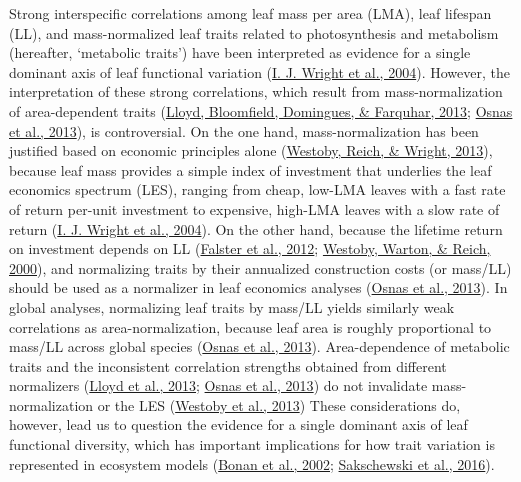 \documentclass[
  12pt,
  letterpaper,
  DIV=11,
  numbers=noendperiod]{scrartcl}
\begin{document}
Strong interspecific correlations among leaf mass per area (LMA), leaf
lifespan (LL), and mass-normalized leaf traits related to photosynthesis
and metabolism (hereafter, `metabolic traits') have been interpreted as
evidence for a single dominant axis of leaf functional variation
(\protect\hyperlink{ref-Wright2004a}{I. J. Wright et al., 2004}).
However, the interpretation of these strong correlations, which result
from mass-normalization of area-dependent traits
(\protect\hyperlink{ref-Lloyd2013}{Lloyd, Bloomfield, Domingues, \&
Farquhar, 2013}; \protect\hyperlink{ref-Osnas2013}{Osnas et al., 2013}),
is controversial. On the one hand, mass-normalization has been justified
based on economic principles alone
(\protect\hyperlink{ref-Westoby2013}{Westoby, Reich, \& Wright, 2013}),
because leaf mass provides a simple index of investment that underlies
the leaf economics spectrum (LES), ranging from cheap, low-LMA leaves
with a fast rate of return per-unit investment to expensive, high-LMA
leaves with a slow rate of return
(\protect\hyperlink{ref-Wright2004a}{I. J. Wright et al., 2004}). On the
other hand, because the lifetime return on investment depends on LL
(\protect\hyperlink{ref-Falster2012}{Falster et al., 2012};
\protect\hyperlink{ref-Westoby2000}{Westoby, Warton, \& Reich, 2000}),
and normalizing traits by their annualized construction costs (or
mass/LL) should be used as a normalizer in leaf economics analyses
(\protect\hyperlink{ref-Osnas2013}{Osnas et al., 2013}). In global
analyses, normalizing leaf traits by mass/LL yields similarly weak
correlations as area-normalization, because leaf area is roughly
proportional to mass/LL across global species
(\protect\hyperlink{ref-Osnas2013}{Osnas et al., 2013}). Area-dependence
of metabolic traits and the inconsistent correlation strengths obtained
from different normalizers (\protect\hyperlink{ref-Lloyd2013}{Lloyd et
al., 2013}; \protect\hyperlink{ref-Osnas2013}{Osnas et al., 2013}) do
not invalidate mass-normalization or the LES
(\protect\hyperlink{ref-Westoby2013}{Westoby et al., 2013}) These
considerations do, however, lead us to question the evidence for a
single dominant axis of leaf functional diversity, which has important
implications for how trait variation is represented in ecosystem models
(\protect\hyperlink{ref-Bonan2002}{Bonan et al., 2002};
\protect\hyperlink{ref-Sakschewski2016}{Sakschewski et al., 2016}).
\end{document}

